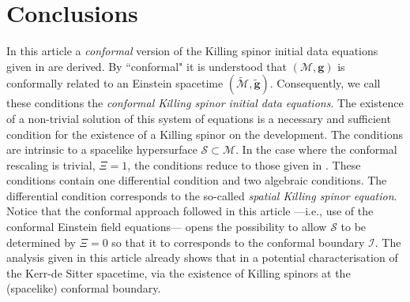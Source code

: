 \documentclass[10pt,a4paper]{article}
\theoremstyle{plain}
\def\bmg{{\bm g}}
\begin{document}
\section*{Conclusions}

In this article a \emph{conformal} version of the Killing spinor
initial data equations given in \cite{GarVal08c} are derived. By
``conformal" it is understood that $(\mathcal{M},\bmg)$ is conformally
related to an Einstein spacetime
$(\tilde{\mathcal{M}},\tilde{\bmg})$. Consequently, we call these
conditions the \emph{conformal Killing spinor initial data equations}.
The existence of a non-trivial solution of this system of equations is
a necessary and sufficient condition for the existence of a Killing
spinor on the development. The conditions are intrinsic to a spacelike
hypersurface $\mathcal{S}\subset\mathcal{M}$. In the
case where the conformal rescaling is trivial, $\Xi = 1$, the
conditions reduce to those given in \cite{BaeVal10b}.  These
conditions contain one differential condition and two algebraic
conditions.  The differential condition corresponds to the so-called
\emph{spatial Killing spinor equation}.
Notice that
the conformal approach followed in this article ---i.e., use of the
 conformal Einstein field equations--- opens the
possibility to allow $\mathcal{S}$ to be determined by $\Xi = 0$ so
that it to corresponds to the conformal boundary $\mathscr{I}$. The
analysis given in this article already shows that in a potential
characterisation of the Kerr-de Sitter spacetime, via the existence of
Killing spinors at the (spacelike) conformal boundary.
\end{document}
